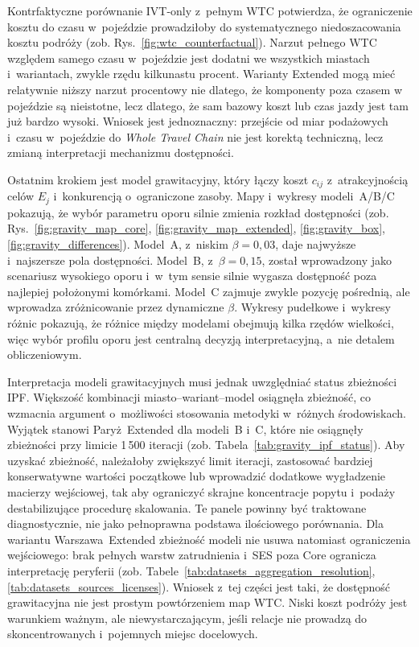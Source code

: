 \documentclass{pracamgr}
\begin{document}
Kontrfaktyczne porównanie \mbox{IVT-only} z~pełnym \mbox{WTC} potwierdza, że ograniczenie kosztu do czasu w~pojeździe prowadziłoby do systematycznego niedoszacowania kosztu podróży (zob. Rys.~\ref{fig:wtc_counterfactual}). Narzut pełnego \mbox{WTC} względem samego czasu w~pojeździe jest dodatni we wszystkich miastach i~wariantach, zwykle rzędu kilkunastu procent. Warianty \mbox{Extended} mogą mieć relatywnie niższy narzut procentowy nie dlatego, że komponenty poza czasem w pojeździe są nieistotne, lecz dlatego, że sam bazowy koszt lub czas jazdy jest tam już bardzo wysoki. Wniosek jest jednoznaczny: przejście od miar podażowych i~czasu w~pojeździe do \textit{Whole Travel Chain} nie jest korektą techniczną, lecz zmianą interpretacji mechanizmu dostępności.

Ostatnim krokiem jest model grawitacyjny, który łączy koszt $c_{ij}$ z~atrakcyjnością celów $E_j$ i~konkurencją o~ograniczone zasoby. Mapy i~wykresy modeli~A/B/C pokazują, że wybór parametru oporu silnie zmienia rozkład dostępności (zob. Rys.~\ref{fig:gravity_map_core}, \ref{fig:gravity_map_extended}, \ref{fig:gravity_box}, \ref{fig:gravity_differences}). Model~A, z~niskim $\beta = 0{,}03$, daje najwyższe i~najszersze pola dostępności. Model~B, z~$\beta = 0{,}15$, został wprowadzony jako scenariusz wysokiego oporu i~w~tym sensie silnie wygasza dostępność poza najlepiej położonymi komórkami. Model~C zajmuje zwykle pozycję pośrednią, ale wprowadza zróżnicowanie przez dynamiczne $\beta$. Wykresy pudełkowe i~wykresy różnic pokazują, że różnice między modelami obejmują kilka rzędów wielkości, więc wybór profilu oporu jest centralną decyzją interpretacyjną, a~nie detalem obliczeniowym.

Interpretacja modeli grawitacyjnych musi jednak uwzględniać status zbieżności \mbox{IPF}. Większość kombinacji miasto--wariant--model osiągnęła zbieżność, co wzmacnia argument o~możliwości stosowania metodyki w~różnych środowiskach. Wyjątek stanowi \mbox{Paryż~Extended} dla modeli~B i~C, które nie osiągnęły zbieżności przy limicie 1\,500 iteracji (zob. Tabela~\ref{tab:gravity_ipf_status}). Aby uzyskać zbieżność, należałoby zwiększyć limit iteracji, zastosować bardziej konserwatywne wartości początkowe lub wprowadzić dodatkowe wygładzenie macierzy wejściowej, tak aby ograniczyć skrajne koncentracje popytu i~podaży destabilizujące procedurę skalowania. Te panele powinny być traktowane diagnostycznie, nie jako pełnoprawna podstawa ilościowego porównania. Dla wariantu \mbox{Warszawa~Extended} zbieżność modeli nie usuwa natomiast ograniczenia wejściowego: brak pełnych warstw zatrudnienia i~\mbox{SES} poza \mbox{Core} ogranicza interpretację peryferii (zob. Tabele~\ref{tab:datasets_aggregation_resolution}, \ref{tab:datasets_sources_licenses}). Wniosek z~tej części jest taki, że dostępność grawitacyjna nie jest prostym powtórzeniem map \mbox{WTC}. Niski koszt podróży jest warunkiem ważnym, ale niewystarczającym, jeśli relacje nie prowadzą do skoncentrowanych i~pojemnych miejsc docelowych.
\end{document}
